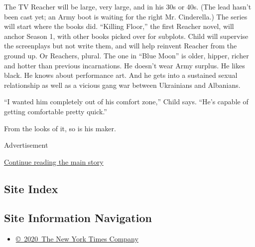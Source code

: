 The TV Reacher will be large, very large, and in his 30s or 40s. (The
lead hasn't been cast yet; an Army boot is waiting for the right Mr.
Cinderella.) The series will start where the books did. ``Killing
Floor,'' the first Reacher novel, will anchor Season 1, with other books
picked over for subplots. Child will supervise the screenplays but not
write them, and will help reinvent Reacher from the ground up. Or
Reachers, plural. The one in ``Blue Moon'' is older, hipper, richer and
hotter than previous incarnations. He doesn't wear Army surplus. He
likes black. He knows about performance art. And he gets into a
sustained sexual relationship as well as a vicious gang war between
Ukrainians and Albanians.

``I wanted him completely out of his comfort zone,'' Child says. ``He's
capable of getting comfortable pretty quick.''

From the looks of it, so is his maker.

Advertisement

\protect\hyperlink{after-bottom}{Continue reading the main story}

\hypertarget{site-index}{%
\subsection{Site Index}\label{site-index}}

\hypertarget{site-information-navigation}{%
\subsection{Site Information
Navigation}\label{site-information-navigation}}

\begin{itemize}
\tightlist
\item
  \href{https://help.nytimes.com/hc/en-us/articles/115014792127-Copyright-notice}{©~2020~The
  New York Times Company}
\end{itemize}

